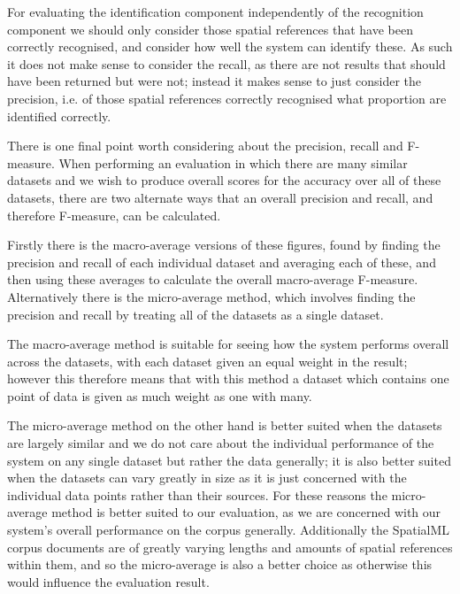 \documentclass[12pt, a4paper]{report}
\begin{document}
For evaluating the identification component independently of the recognition component we should only consider those spatial references that have been correctly recognised, and consider how well the system can identify these. As such it does not make sense to consider the recall, as there are not results that should have been returned but were not; instead it makes sense to just consider the precision, i.e. of those spatial references correctly recognised what proportion are identified correctly.

There is one final point worth considering about the precision, recall and F-measure. When performing an evaluation in which there are many similar datasets and we wish to produce overall scores for the accuracy over all of these datasets, there are two alternate ways that an overall precision and recall, and therefore F-measure, can be calculated.

Firstly there is the macro-average versions of these figures, found by finding the precision and recall of each individual dataset and averaging each of these, and then using these averages to calculate the overall macro-average F-measure. Alternatively there is the micro-average method, which involves finding the precision and recall by treating all of the datasets as a single dataset.

The macro-average method is suitable for seeing how the system performs overall across the datasets, with each dataset given an equal weight in the result; however this therefore means that with this method a dataset which contains one point of data is given as much weight as one with many.

The micro-average method on the other hand is better suited when the datasets are largely similar and we do not care about the individual performance of the system on any single dataset but rather the data generally; it is also better suited when the datasets can vary greatly in size as it is just concerned with the individual data points rather than their sources. For these reasons the micro-average method is better suited to our evaluation, as we are concerned with our system's overall performance on the corpus generally. Additionally the SpatialML corpus documents are of greatly varying lengths and amounts of spatial references within them, and so the micro-average is also a better choice as otherwise this would influence the evaluation result.


\end{document}
